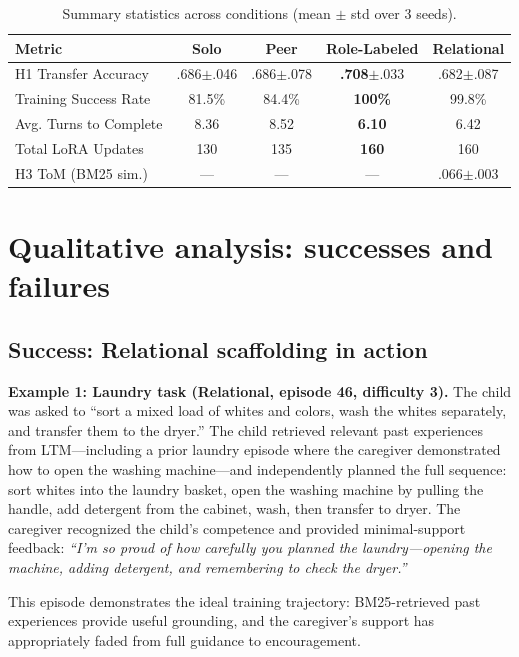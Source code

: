 \documentclass{article}
\begin{document}
\begin{table}[h]
  \caption{Summary statistics across conditions (mean $\pm$ std over 3 seeds).}
  \label{tab:summary}
  \centering
  \small
  \begin{tabular}{lcccc}
    \toprule
    \textbf{Metric} & \textbf{Solo} & \textbf{Peer} & \textbf{Role-Labeled} & \textbf{Relational} \\
    \midrule
    H1 Transfer Accuracy & .686\tiny{$\pm$.046} & .686\tiny{$\pm$.078} & \textbf{.708}\tiny{$\pm$.033} & .682\tiny{$\pm$.087} \\
    Training Success Rate & 81.5\% & 84.4\% & \textbf{100\%} & 99.8\% \\
    Avg. Turns to Complete & 8.36 & 8.52 & \textbf{6.10} & 6.42 \\
    Total LoRA Updates & 130 & 135 & \textbf{160} & 160 \\
    H3 ToM (BM25 sim.) & --- & --- & --- & .066\tiny{$\pm$.003} \\
    \bottomrule
  \end{tabular}
\end{table}

\section{Qualitative analysis: successes and failures}

\subsection{Success: Relational scaffolding in action}

\textbf{Example 1: Laundry task (Relational, episode 46, difficulty 3).} The child was asked to ``sort a mixed load of whites and colors, wash the whites separately, and transfer them to the dryer.'' The child retrieved relevant past experiences from LTM---including a prior laundry episode where the caregiver demonstrated how to open the washing machine---and independently planned the full sequence: sort whites into the laundry basket, open the washing machine by pulling the handle, add detergent from the cabinet, wash, then transfer to dryer. The caregiver recognized the child's competence and provided minimal-support feedback: \emph{``I'm so proud of how carefully you planned the laundry---opening the machine, adding detergent, and remembering to check the dryer.''}

This episode demonstrates the ideal training trajectory: BM25-retrieved past experiences provide useful grounding, and the caregiver's support has appropriately faded from full guidance to encouragement.
\end{document}
